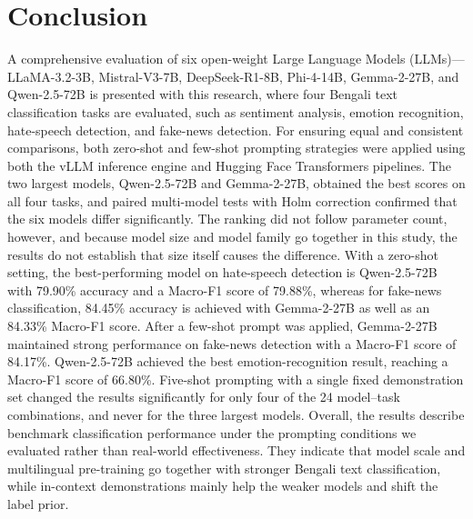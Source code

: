 \documentclass[10pt,letterpaper]{article}
\begin{document}
\section*{Conclusion}
\label{sec:conclusion} 

A comprehensive evaluation of six open-weight Large Language Models (LLMs)—LLaMA-3.2-3B, Mistral-V3-7B, DeepSeek-R1-8B, Phi-4-14B, Gemma-2-27B, and Qwen-2.5-72B is presented with this research, where four Bengali text classification tasks are evaluated, such as sentiment analysis, emotion recognition, hate-speech detection, and fake-news detection. For ensuring equal and consistent comparisons, both zero-shot and few-shot prompting strategies were applied using both the vLLM inference engine and Hugging Face Transformers pipelines. The two largest models, Qwen-2.5-72B and Gemma-2-27B, obtained the best scores on all four tasks, and paired multi-model tests with Holm correction confirmed that the six models differ significantly. The ranking did not follow parameter count, however, and because model size and model family go together in this study, the results do not establish that size itself causes the difference. With a zero-shot setting, the best-performing model on hate-speech detection is Qwen-2.5-72B with 79.90\% accuracy and a Macro-F1 score of 79.88\%, whereas for fake-news classification, 84.45\% accuracy is achieved with Gemma-2-27B as well as an 84.33\% Macro-F1 score. After a few-shot prompt was applied, Gemma-2-27B maintained strong performance on fake-news detection with a Macro-F1 score of 84.17\%. Qwen-2.5-72B achieved the best emotion-recognition result, reaching a Macro-F1 score of 66.80\%. Five-shot prompting with a single fixed demonstration set changed the results significantly for only four of the 24 model--task combinations, and never for the three largest models. Overall, the results describe benchmark classification performance under the prompting conditions we evaluated rather than real-world effectiveness. They indicate that model scale and multilingual pre-training go together with stronger Bengali text classification, while in-context demonstrations mainly help the weaker models and shift the label prior.
\end{document}
